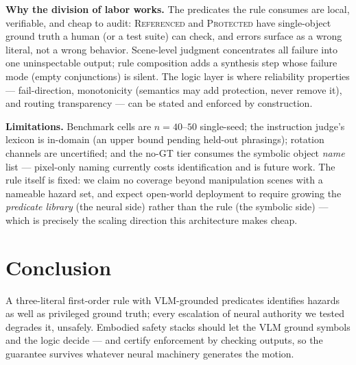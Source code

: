 \documentclass[conference]{IEEEtran}
\begin{document}
\textbf{Why the division of labor works.} The predicates the rule consumes are local, verifiable, and cheap to audit: \textsc{Referenced} and \textsc{Protected} have single-object ground truth a human (or a test suite) can check, and errors surface as a wrong literal, not a wrong behavior. Scene-level judgment concentrates all failure into one uninspectable output; rule composition adds a synthesis step whose failure mode (empty conjunctions) is silent. The logic layer is where reliability properties --- fail-direction, monotonicity (semantics may add protection, never remove it), and routing transparency --- can be stated and enforced by construction.

\textbf{Limitations.} Benchmark cells are $n{=}40$--$50$ single-seed; the instruction judge's lexicon is in-domain (an upper bound pending held-out phrasings); rotation channels are uncertified; and the no-GT tier consumes the symbolic object \emph{name} list --- pixel-only naming currently costs identification and is future work. The rule itself is fixed: we claim no coverage beyond manipulation scenes with a nameable hazard set, and expect open-world deployment to require growing the \emph{predicate library} (the neural side) rather than the rule (the symbolic side) --- which is precisely the scaling direction this architecture makes cheap.

\section{Conclusion}
A three-literal first-order rule with VLM-grounded predicates identifies hazards as well as privileged ground truth; every escalation of neural authority we tested degrades it, unsafely. Embodied safety stacks should let the VLM ground symbols and the logic decide --- and certify enforcement by checking outputs, so the guarantee survives whatever neural machinery generates the motion.
\end{document}
